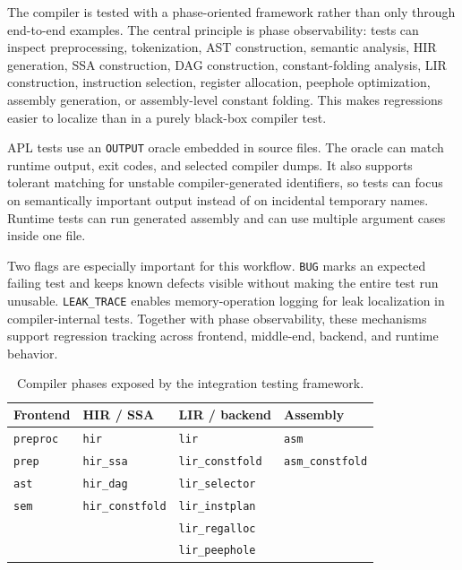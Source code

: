 \documentclass[10pt,twocolumn]{article}
\begin{document}
\par The compiler is tested with a phase-oriented framework rather than only through end-to-end examples. The central principle is phase observability: tests can inspect preprocessing, tokenization, AST construction, semantic analysis, HIR generation, SSA construction, DAG construction, constant-folding analysis, LIR construction, instruction selection, register allocation, peephole optimization, assembly generation, or assembly-level constant folding. This makes regressions easier to localize than in a purely black-box compiler test.
\par APL tests use an \texttt{OUTPUT} oracle embedded in source files. The oracle can match runtime output, exit codes, and selected compiler dumps. It also supports tolerant matching for unstable compiler-generated identifiers, so tests can focus on semantically important output instead of on incidental temporary names. Runtime tests can run generated assembly and can use multiple argument cases inside one file.
\par Two flags are especially important for this workflow. \texttt{BUG} marks an expected failing test and keeps known defects visible without making the entire test run unusable. \texttt{LEAK\_TRACE} enables memory-operation logging for leak localization in compiler-internal tests. Together with phase observability, these mechanisms support regression tracking across frontend, middle-end, backend, and runtime behavior.

\begin{table}[t]
\centering
\footnotesize
\caption{Compiler phases exposed by the integration testing framework.}
\label{tab:testing-modules}
\begin{tabular}{llll}
\toprule
Frontend & HIR / SSA & LIR / backend & Assembly \\
\midrule
\texttt{preproc} & \texttt{hir} & \texttt{lir} & \texttt{asm} \\
\texttt{prep} & \texttt{hir\_ssa} & \texttt{lir\_constfold} & \texttt{asm\_constfold} \\
\texttt{ast} & \texttt{hir\_dag} & \texttt{lir\_selector} &  \\
\texttt{sem} & \texttt{hir\_constfold} & \texttt{lir\_instplan} &  \\
 &  & \texttt{lir\_regalloc} &  \\
 &  & \texttt{lir\_peephole} &  \\
\bottomrule
\end{tabular}
\end{table}
\end{document}
